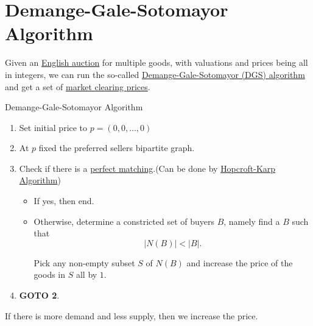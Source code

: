 \section{Demange-Gale-Sotomayor Algorithm}
Given an \hyperref[eg:English-auction]{English auction} for multiple goods, with valuations and prices being all in integers, we can run the
so-called \hyperref[algo:Demange-Gale-Sotomayor-algorithm]{Demange-Gale-Sotomayor (DGS) algorithm} and get a set of
\hyperref[note:market-clearing-prices]{market clearing prices}.

\par
\begin{algorithm}[H]\label{algo:Demange-Gale-Sotomayor-algorithm}
	\DontPrintSemicolon
	\caption{Demange-Gale-Sotomayor Algorithm}
	\BlankLine

\end{algorithm}

\begin{enumerate}
	\item Set initial price to \(p = (0, 0, \ldots , 0 )\)
	\item At \(p\) fixed the preferred sellers bipartite graph.
	\item Check if there is a \hyperref[def:perfect-matching]{perfect matching}.(Can be done by \hyperref[sec:Hopcroft-Karp-algorithm]{Hopcroft-Karp Algorithm})
	      \begin{itemize}
		      \item If yes, then end.
		      \item Otherwise, determine a constricted set of buyers \(B\), namely find a \(B\) such that
		            \[
			            \left\vert N(B) \right\vert < \left\vert B \right\vert.
		            \]

		            Pick any non-empty subset \(S\) of \(N(B)\) and increase the price of the goods in \(S\) all by \(1\).
	      \end{itemize}
	\item \textbf{GOTO 2}.
\end{enumerate}

\begin{intuition}
	If there is more demand and less supply, then we increase the price.
\end{intuition}


